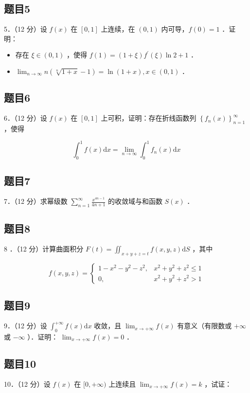 \documentclass{article}
\begin{document}
\subsection{题目5}
5．（12 分）设 \(f(x)\) 在 \([0,1]\) 上连续，在 \((0,1)\) 内可导，\(f(0)=1\) ．证明：

\begin{itemize}
  \item[（1）] 存在 \(\xi \in(0,1)\) ，使得 \(f(1)=(1+\xi) f^{\prime}(\xi) \ln 2+1\) ．
  \item[（2）] \(\lim _{n \rightarrow \infty} n(\sqrt[n]{1+x}-1)=\ln (1+x), x \in(0,1)\) ．
\end{itemize}

\subsection{题目6}
6．（12 分）设 \(f(x)\) 在 \([0,1]\) 上可积，证明：存在折线函数列 \(\left\{f_{n}(x)\right\}_{n=1}^{\infty}\) ，使得

\[
\int_{0}^{1} f(x) \mathrm{d} x=\lim _{n \rightarrow \infty} \int_{0}^{1} f_{n}(x) \mathrm{d} x
\]

\subsection{题目7}
7．（12 分）求幂级数 \(\sum_{n=1}^{\infty} \frac{x^{4 n-1}}{4 n+1}\) 的收敛域与和函数 \(S(x)\) ．\\

\subsection{题目8}
8 ．（12 分）计算曲面积分 \(F(t)=\iint_{x+y+z=t} f(x, y, z) \mathrm{d} S\) ，其中

\[
f(x, y, z)= \begin{cases}1-x^{2}-y^{2}-z^{2}, & x^{2}+y^{2}+z^{2} \leq 1 \\ 0, & x^{2}+y^{2}+z^{2}>1\end{cases}
\]

\subsection{题目9}
9．（12 分）设 \(\int_{0}^{+\infty} f(x) \mathrm{d} x\) 收敛，且 \(\lim _{x \rightarrow+\infty} f(x)\) 有意义（有限数或 \(+\infty\) 或 \(-\infty\) ）．证明： \(\lim _{x \rightarrow+\infty} f(x)=0\) ．\\

\subsection{题目10}
10．（12 分）设 \(f(x)\) 在 \([0,+\infty)\) 上连续且 \(\lim _{x \rightarrow+\infty} f(x)=k\) ，试证：
\end{document}
